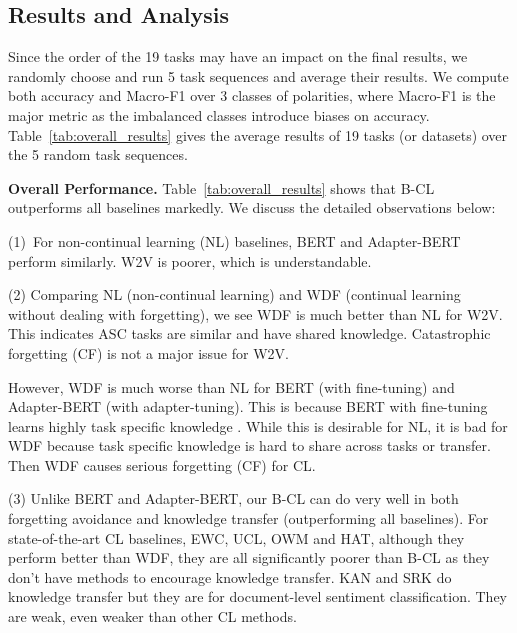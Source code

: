 \documentclass[11pt]{article}
\begin{document}
\subsection{Results and Analysis}
\label{sec:results}
Since the order of the 19 tasks may have an impact on the final results, we randomly choose and run 5 task sequences and average their results. 
We compute both accuracy and Macro-F1 over 3 classes of polarities, where Macro-F1 is the major metric as the imbalanced classes introduce biases on accuracy. {\color{black}Table~\ref{tab:overall_results} gives the average results of 19 tasks (or datasets) over the 5 random task sequences.} 


\textbf{Overall Performance.} 
Table~\ref{tab:overall_results} shows that B-CL outperforms all baselines markedly. We discuss the detailed observations below:


(1)~For non-continual learning (NL) baselines, BERT and Adapter-BERT perform similarly. W2V is poorer, which is understandable.  

{\color{black}(2) Comparing NL (non-continual learning) and WDF (continual learning without dealing with forgetting), we see WDF is much better than NL for W2V. This indicates ASC tasks are similar and have shared knowledge. Catastrophic forgetting (CF) is not a major issue for W2V. 

However, WDF is much worse than NL for BERT (with fine-tuning) and Adapter-BERT (with adapter-tuning). This is because BERT with fine-tuning learns highly task specific knowledge \cite{DBLP:journals/corr/abs-2004-14448}. While this is desirable for NL, it is bad for WDF because task specific knowledge is hard to share across tasks or transfer. Then WDF causes serious forgetting (CF) for CL.} 

(3) Unlike BERT and Adapter-BERT, our B-CL can do very well in both forgetting avoidance and knowledge transfer (outperforming all baselines). For state-of-the-art CL baselines, EWC, UCL, OWM and HAT, although they perform better than WDF, they are all significantly poorer than B-CL as they don't have methods to encourage knowledge transfer. KAN and SRK do knowledge transfer but they are for document-level sentiment classification. They are weak, even weaker than other CL methods. 
\end{document}
